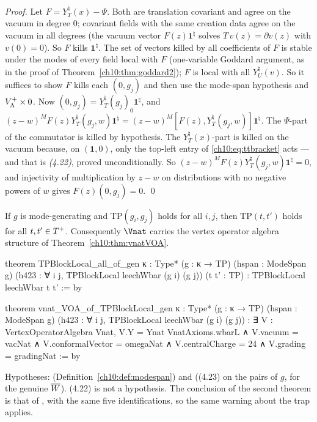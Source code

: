 \emph{Proof.}  Let $F=Y^\natural_T(x)-\Psi$.  Both are translation covariant and agree on the vacuum
in degree $0$; covariant fields with the same creation data agree on the vacuum in all degrees
(the vacuum vector $F(z)\mathbf1^\natural$ solves $T\,v(z)=\partial v(z)$ with $v(0)=0$).  So $F$ kills
$\mathbf1^\natural$.  The set of vectors killed by all coefficients of $F$ is stable under the
modes of every field local with $F$ (one-variable Goddard argument, as in the proof of
Theorem~\ref{ch10:thm:goddard2}); $F$ is local with all $Y^\natural_U(v)$.  So it suffices to show
$F$ kills each $(0,g_j)$ and then use the mode-span hypothesis and $V_{\Lambda}^{+}\times0$.  Now
$(0,g_j)=Y^\natural_T(g_j)_0\mathbf1^\natural$, and $(z-w)^MF(z)Y^\natural_T(g_j,w)\mathbf1^\natural
=(z-w)^M[F(z),Y^\natural_T(g_j,w)]\mathbf1^\natural$.  The $\Psi$-part of the commutator is killed by
hypothesis.  The $Y^\natural_T(x)$-part is killed on the vacuum because, on $(\mathbf 1,0)$, only
the top-left entry of \eqref{ch10:eq:ttbracket} acts --- and that is \emph{(4.22)}, proved
unconditionally.  So $(z-w)^MF(z)Y^\natural_T(g_j,w)\mathbf1^\natural=0$, and injectivity of
multiplication by $z-w$ on distributions with no negative powers of $w$ gives
$F(z)(0,g_j)=0$. \qed

\begin{theorem}\label{ch10:thm:allofgen}
If $g$ is mode-generating and $\mathrm{TP}(g_i,g_j)$ holds for all $i,j$, then
$\mathrm{TP}(t,t')$ holds for all $t,t'\in T^{+}$.  Consequently $\Vnat$ carries the
vertex operator algebra structure of Theorem~\ref{ch10:thm:vnatVOA}.
\end{theorem}
\begin{leancode}
theorem TPBlockLocal_all_of_gen {κ : Type*} (g : κ → TP) (hspan : ModeSpan g)
    (h423 : ∀ i j, TPBlockLocal leechWbar (g i) (g j)) (t t' : TP) :
    TPBlockLocal leechWbar t t' := by

theorem vnat_VOA_of_TPBlockLocal_gen {κ : Type*} (g : κ → TP) (hspan : ModeSpan g)
    (h423 : ∀ i j, TPBlockLocal leechWbar (g i) (g j)) :
    ∃ V : VertexOperatorAlgebra Vnat,
      V.Y = Ynat VnatAxioms.wbarL ∧ V.vacuum = vacNat ∧ V.conformalVector = omegaNat ∧
        V.centralCharge = 24 ∧ V.grading = gradingNat := by
\end{leancode}
\begin{dictionary}
Hypotheses:  (Definition~\ref{ch10:def:modespan}) and  ((4.23) on the
pairs of $g$, for the genuine $\overline{W}$).  (4.22) is not a hypothesis.  The conclusion of the
second theorem is that of , with the same five identifications, so the
same warning about the trap applies.
\end{dictionary}

